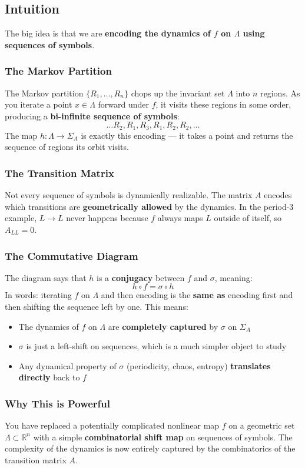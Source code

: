 \documentclass{article}
\begin{document}
\begin{mdframed}
    \subsection*{Intuition}
The big idea is that we are \textbf{encoding the dynamics of $f$ on $\Lambda$ using sequences of symbols}.

\subsubsection*{The Markov Partition}
The Markov partition $\{R_1, \ldots, R_n\}$ chops up the invariant set $\Lambda$ into $n$ regions. 
As you iterate a point $x \in \Lambda$ forward under $f$, it visits these regions in some order, 
producing a \textbf{bi-infinite sequence of symbols}:
\[
\ldots R_2, R_1, R_3, R_1, R_2, R_2, \ldots
\]
The map $h: \Lambda \to \Sigma_A$ is exactly this encoding --- it takes a point and returns the 
sequence of regions its orbit visits.

\subsubsection*{The Transition Matrix}
Not every sequence of symbols is dynamically realizable. The matrix $A$ encodes which transitions 
are \textbf{geometrically allowed} by the dynamics. In the period-3 example, $L \to L$ never happens 
because $f$ always maps $L$ outside of itself, so $A_{LL} = 0$.

\subsubsection*{The Commutative Diagram}
The diagram says that $h$ is a \textbf{conjugacy} between $f$ and $\sigma$, meaning:
\[
h \circ f = \sigma \circ h
\]
In words: iterating $f$ on $\Lambda$ and then encoding is the \textbf{same as} encoding first and 
then shifting the sequence left by one. This means:
\begin{itemize}
    \item The dynamics of $f$ on $\Lambda$ are \textbf{completely captured} by $\sigma$ on $\Sigma_A$
    \item $\sigma$ is just a left-shift on sequences, which is a much simpler object to study
    \item Any dynamical property of $\sigma$ (periodicity, chaos, entropy) \textbf{translates directly} 
    back to $f$
\end{itemize}

\subsubsection*{Why This is Powerful}
You have replaced a potentially complicated nonlinear map $f$ on a geometric set 
$\Lambda \subset \mathbb{R}^n$ with a simple \textbf{combinatorial shift map} on sequences of symbols. 
The complexity of the dynamics is now entirely captured by the combinatorics of the transition matrix $A$.
\end{mdframed}
\end{document}
